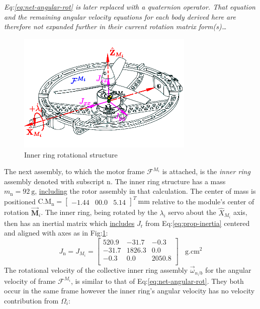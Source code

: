\emph{\color{gray} Eq:\ref{eq:net-angular-rot} is later replaced with a quaternion operator. That equation and the remaining angular velocity equations for each body derived here are therefore not expanded further in their current rotation matrix form(s)\ldots}
\par
\begin{figure}[htbp]
\vspace{-12pt}
\centering
\includegraphics[width=0.75\textwidth]{figs/inertia-inner}
\vspace{-10pt}
\caption{Inner ring rotational structure}
\label{fig:inertia-inner}
\end{figure}
The next assembly, to which the motor frame $\mathcal{F}^{M_i}$ is attached, is the \emph{inner ring} assembly denoted with subscript n. The inner ring structure has a mass $m_\text{n}=92~\text{g}$, \underline{including} the rotor assembly in that calculation. The center of mass is positioned $\text{C.M}_{\text{n}}=\begin{bmatrix}-1.44&00.0&5.14\end{bmatrix}^T~\text{mm}$ relative to the module's center of rotation $\vec{\mathbf{M}}_i$. The inner ring, being rotated by the $\lambda_i$ servo about the $\hat{X}_{M_i}$ axis, then has an inertial matrix which \underline{includes} $J_\text{r}$ from Eq:\ref{eq:prop-inertia} centered and aligned with axes as in Fig:\ref{fig:inertia-inner}:
\begin{equation} \label{eq:inertia.inner}
J_\text{n}=J_{M_i}=\begin{bmatrix}
520.9 & -31.7	& -0.3\\
-31.7 & 1826.3 & 0.0\\
-0.3 & 0.0	& 2050.8\\
\end{bmatrix}~~~~\text{g.cm}^2
\end{equation}
The rotational velocity of the collective inner ring assembly $\vec{\omega}_{n/b}$ for the angular velocity of frame $\mathcal{F}^{M_i}$, is similar to that of Eq:\ref{eq:net-angular-rot}. They both occur in the same frame however the inner ring's angular velocity has no velocity contribution from $\Omega_i$:
